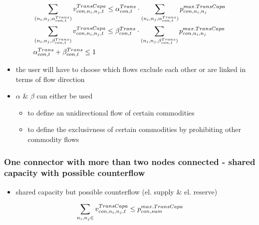 \begin{align} \label{eq:transconstraints1}
	& \sum_{(n_i,n_j,\alpha^{Trans}_{{con},t})} v^{TransCapa}_{{con},n_i,n_j,t} \leq \alpha^{Trans}_{{con},t} \cdot \sum_{(n_i,n_j,\alpha^{Trans}_{{con},t})} p^{max.TransCapa}_{{con},n_i,n_j}  \\
	& \sum_{(n_i,n_j,\beta^{Trans}_{{con},t})}  v^{TransCapa}_{{con},n_i,n_j,t} \leq \beta^{Trans}_{{con},t} \cdot \sum_{(n_i,n_j,\beta^{Trans}_{{con},t})}  p^{max.TransCapa}_{{con},n_i,n_j}\\
	&\alpha^{Trans}_{{con},t} + \beta^{Trans}_{{con},t} \leq 1
\end{align}
\begin{itemize}
	\item the user will have to choose which flows exclude each other or are linked in terms of flow direction
	\item $\alpha$ \& $\beta$ can either be used
		\begin{itemize}
	\item 	to define an unidirectional flow of certain commodities
	\item to define the exclusivness of certain commodities by prohibiting other commodity flows
	\end{itemize}
\end{itemize}
\subsubsection{One connector with more than two nodes connected - shared capacity with possible counterflow}
\begin{itemize}
	\item shared capacity but possible counterflow (el. supply \& el. reserve)
\end{itemize}
	\begin{align} \label{eq:transconstraints1}
		&\sum_{n_i,n_j \in }\vTranCapa \leq \pMaxTransCapa[con,sum]\\  %
	\end{align}
